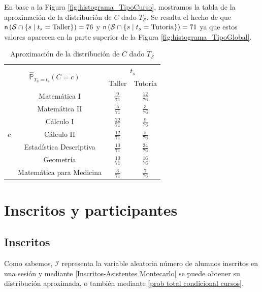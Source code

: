 \documentclass[11pt,a4paper]{book}
\theoremstyle{definition}%
\newcommand{\Probsymb}{\mathds{P}}
\newcommand{\card}[1]{\text{\textsf{n}}\left( #1 \right)}
\begin{document}
            En base a la Figura \ref{fig:histograma_TipoCurso}, mostramos la tabla de la aproximación de la distribución de $C$ dado $T_\mathcal{S}$. Se resalta el hecho de que $\card{\mathcal{S}\cap\{s\mid t_s=\text{Taller}\}}=76$ y $\card{\mathcal{S}\cap\{s\mid t_s=\text{Tutoria}\}}=71$ ya que estos valores aparecen en la parte superior de la Figura \ref{fig:histograma_TipoGlobal}.
            \begin{table}[H]
                \centering
                \begin{tabular}{|c|c|c|c|}
                    \hline
                    \multicolumn{2}{|c|}{\multirow{2}{*}{$\hat{\Probsymb}_{T_\mathcal{S}=t_s}(C=c)$}} & \multicolumn{2}{c|}{$t_s$} \\ \cline{3-4}
                    \multicolumn{2}{|c|}{} & Taller & Tutoría \\ \hline
                    \multirow{7}{*}{$c$} & Matemática I & $\frac{9}{71}$ & $\frac{12}{76}$ \\ \cline{2-4}
                    & Matemática II & $\frac{5}{71}$ & $\frac{3}{76}$  \\ \cline{2-4}
                    & Cálculo I & $\frac{22}{71}$ & $\frac{9}{76}$  \\ \cline{2-4}
                    & Cálculo II & $\frac{12}{71}$ & $\frac{5}{76}$  \\ \cline{2-4}
                    & Estadística Descriptiva & $\frac{10}{71}$ & $\frac{24}{76}$  \\ \cline{2-4}
                    & Geometría & $\frac{10}{71}$ & $\frac{16}{76}$  \\ \cline{2-4}
                    & Matemática para Medicina & $\frac{3}{71}$ & $\frac{7}{76}$  \\ \hline
                \end{tabular}                    
                \caption{Aproximación de la distribución de $C$ dado $T_\mathcal{S}$}
                \label{tab:distribucion_C_Ts}
            \end{table}
        \section{Inscritos y participantes}
            \subsection{Inscritos}
                Como sabemos, $\mathcal{I}$ representa la variable aleatoria número de alumnos inscritos en una sesión y mediante \ref{Inscritos-Asistentes Montecarlo} se puede obtener su distribución aproximada, o también mediante \ref{prob total condicional cursos}.
\end{document}
